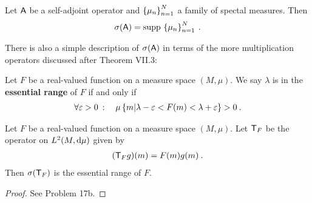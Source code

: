 \begin{proposition}
    Let $\mathsf{A}$ be a self-adjoint operator and $\left \lbrace \mu_n \right \rbrace_{n=1}^N$ a family of spectal measures. Then \begin{align}
        \sigma(\mathsf{A}) = \mathrm{supp}\, \left \lbrace \mu_n \right \rbrace_{n=1}^N \:.
    \end{align}
\end{proposition}

There is also a simple description of $\sigma(\mathsf{A})$ in terms of the more multiplication operators discussed after Theorem VII.3:

\begin{definition}
    Let $F$ be a real-valued function on a measure space $(M, \mu)$. We say $\lambda$ is in the \textbf{essential range} of $F$ if and only if \begin{align}
        \forall \varepsilon > 0 \: : \quad  \mu \left \lbrace m | \lambda - \varepsilon < F(m) < \lambda + \varepsilon  \right \rbrace > 0 \:.
    \end{align}
\end{definition}

\begin{proposition}
    Let $F$ be a real-valued function on a measure space $(M, \mu)$. Let $\mathsf{T}_F$ be the operator on $L^{2}(M, \mathrm{d} \mu)$ given by \begin{align}
        (\mathsf{T}_F g)(m) = F(m) g(m) \:.
    \end{align}
    Then $\sigma(\mathsf{T}_F)$ is the essential range of $F$.
\end{proposition}

\begin{proof}
    See Problem 17b.
\end{proof}

